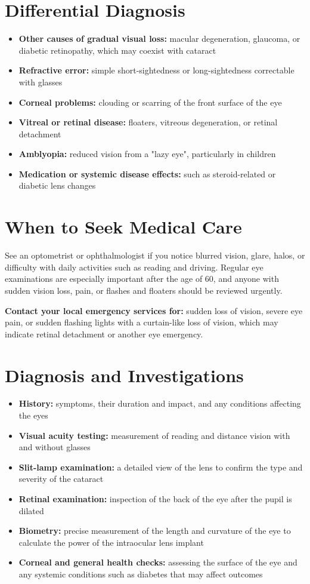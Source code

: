 \section*{Differential Diagnosis}
\begin{itemize}
    \item \textbf{Other causes of gradual visual loss:} macular degeneration, glaucoma, or diabetic retinopathy, which may coexist with cataract
    \item \textbf{Refractive error:} simple short-sightedness or long-sightedness correctable with glasses
    \item \textbf{Corneal problems:} clouding or scarring of the front surface of the eye
    \item \textbf{Vitreal or retinal disease:} floaters, vitreous degeneration, or retinal detachment
    \item \textbf{Amblyopia:} reduced vision from a "lazy eye", particularly in children
    \item \textbf{Medication or systemic disease effects:} such as steroid-related or diabetic lens changes
\end{itemize}

\section*{When to Seek Medical Care}
See an optometrist or ophthalmologist if you notice blurred vision, glare, halos, or difficulty with daily activities such as reading and driving. Regular eye examinations are especially important after the age of 60, and anyone with sudden vision loss, pain, or flashes and floaters should be reviewed urgently.

\textbf{Contact your local emergency services for:} sudden loss of vision, severe eye pain, or sudden flashing lights with a curtain-like loss of vision, which may indicate retinal detachment or another eye emergency.

\section*{Diagnosis and Investigations}
\begin{itemize}
    \item \textbf{History:} symptoms, their duration and impact, and any conditions affecting the eyes
    \item \textbf{Visual acuity testing:} measurement of reading and distance vision with and without glasses
    \item \textbf{Slit-lamp examination:} a detailed view of the lens to confirm the type and severity of the cataract
    \item \textbf{Retinal examination:} inspection of the back of the eye after the pupil is dilated
    \item \textbf{Biometry:} precise measurement of the length and curvature of the eye to calculate the power of the intraocular lens implant
    \item \textbf{Corneal and general health checks:} assessing the surface of the eye and any systemic conditions such as diabetes that may affect outcomes
\end{itemize}

